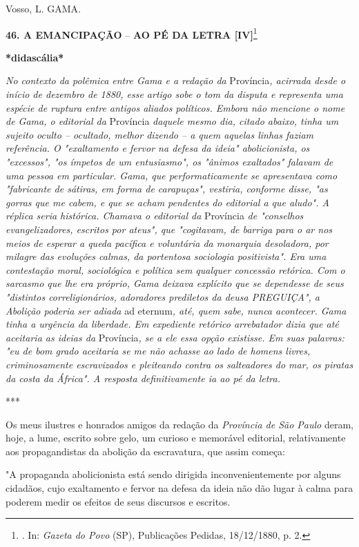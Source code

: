 Vosso, L. GAMA.

\textbf{46. A EMANCIPAÇÃO} -- \textbf{AO PÉ DA LETRA {[}IV{]}}\footnote{.
  In: \emph{Gazeta do Povo} (SP), Publicações Pedidas, 18/12/1880, p. 2.}

\textbf{*didascália*}

\emph{No contexto da polêmica entre Gama e a redação da}
Província\emph{, acirrada desde o início de dezembro de 1880, esse
artigo sobe o tom da disputa e representa uma espécie de ruptura entre
antigos aliados políticos. Embora não mencione o nome de Gama, o
editorial da} Província \emph{daquele mesmo dia, citado abaixo, tinha um
sujeito oculto -- ocultado, melhor dizendo -- a quem aquelas linhas
faziam referência. O "exaltamento e fervor na defesa da ideia"
abolicionista, os "excessos", "os ímpetos de um entusiasmo", os "ânimos
exaltados" falavam de uma pessoa em particular. Gama, que
performaticamente se apresentava como "fabricante de sátiras, em forma
de carapuças", vestiria, conforme disse, "as gorras que me cabem, e que
se acham pendentes do editorial a que aludo". A réplica seria histórica.
Chamava o editorial da} Província \emph{de "conselhos evangelizadores,
escritos por ateus", que "cogitavam, de barriga para o ar nos meios de
esperar a queda pacífica e voluntária da monarquia desoladora, por
milagre das evoluções calmas, da portentosa sociologia positivista". Era
uma contestação moral, sociológica e política sem qualquer concessão
retórica. Com o sarcasmo que lhe era próprio, Gama deixava explícito que
se dependesse de seus "distintos correligionários, adoradores prediletos
da deusa PREGUIÇA", a Abolição poderia ser adiada} ad eternum\emph{,
até, quem sabe, nunca acontecer. Gama tinha a urgência da liberdade. Em
expediente retórico arrebatador dizia que até aceitaria as ideias da}
Província\emph{, se a ele essa opção existisse. Em suas palavras: "eu de
bom grado aceitaria se me não achasse ao lado de homens livres,
criminosamente escravizados e pleiteando contra os salteadores do mar,
os piratas da costa da África". A resposta definitivamente ia ao pé da
letra. }

***

Os meus ilustres e honrados amigos da redação da \emph{Província de São
Paulo} deram, hoje, a lume, escrito sobre gelo, um curioso e memorável
editorial, relativamente aos propagandistas da abolição da escravatura,
que assim começa:

"A propaganda abolicionista está sendo dirigida inconvenientemente por
alguns cidadãos, cujo exaltamento e fervor na defesa da ideia não dão
lugar à calma para poderem medir os efeitos de seus discursos e
escritos.

